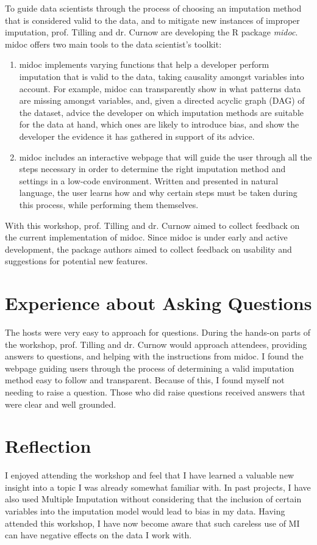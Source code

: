 \documentclass{IEEEtran}
\begin{document}
To guide data scientists through the process of choosing an imputation method that is considered valid to the data, and to mitigate new instances of improper imputation, prof. Tilling and dr. Curnow are developing the R package \textit{midoc}.
midoc offers two main tools to the data scientist's toolkit:
\begin{enumerate}
    \item midoc implements varying functions that help a developer perform imputation that is valid to the data, taking causality amongst variables into account.
    For example, midoc can transparently show in what patterns data are missing amongst variables, and, given a directed acyclic graph (DAG) of the dataset, advice the developer on which imputation methods are suitable for the data at hand, which ones are likely to introduce bias, and show the developer the evidence it has gathered in support of its advice.
    \item midoc includes an interactive webpage that will guide the user through all the steps necessary in order to determine the right imputation method and settings in a low-code environment.
    Written and presented in natural language, the user learns how and why certain steps must be taken during this process, while performing them themselves.
\end{enumerate}

With this workshop, prof. Tilling and dr. Curnow aimed to collect feedback on the current implementation of midoc.
Since midoc is under early and active development, the package authors aimed to collect feedback on usability and suggestions for potential new features.

\section{Experience about Asking Questions}
The hosts were very easy to approach for questions.
During the hands-on parts of the workshop, prof. Tilling and dr. Curnow would approach attendees, providing answers to questions, and helping with the instructions from midoc.
I found the webpage guiding users through the process of determining a valid imputation method easy to follow and transparent.
Because of this, I found myself not needing to raise a question.
Those who did raise questions received answers that were clear and well grounded.

\section{Reflection}
I enjoyed attending the workshop and feel that I have learned a valuable new insight into a topic I was already somewhat familiar with.
In past projects, I have also used Multiple Imputation without considering that the inclusion of certain variables into the imputation model would lead to bias in my data.
Having attended this workshop, I have now become aware that such careless use of MI can have negative effects on the data I work with.
\end{document}
